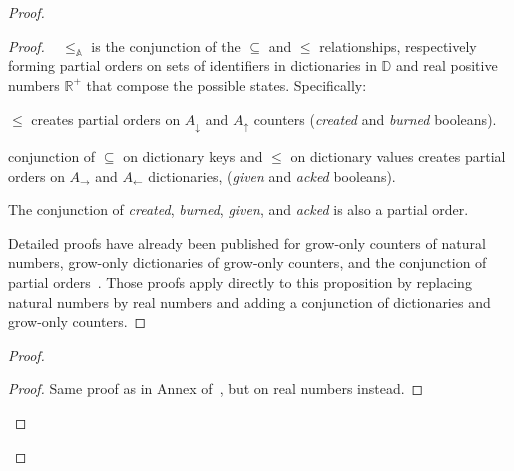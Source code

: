 \documentclass[9pt]{article}   	%
\begin{document}
	
\begin{proof}
	\begin{proof}
		\pfsketch~ $\leq_\mathds{A}$ is the conjunction of the $\subseteq$ and $\leq$ relationships, respectively forming partial orders on sets of identifiers in dictionaries in $\mathds{D}$ and real positive numbers $\mathds{R}^+$ that compose the possible states. Specifically:
		\begin{pfenum}
			\item $\leq$ creates partial orders on $A_\downarrow$ and $A_\uparrow$ counters (\textit{created} and \textit{burned} booleans).
			\item conjunction of $\subseteq$ on dictionary keys and $\leq$ on dictionary values creates partial orders on $A_\rightarrow$ and $A_\leftarrow$ dictionaries, (\textit{given} and \textit{acked} booleans).
			\item The conjunction of \textit{created}, \textit{burned}, \textit{given}, and \textit{acked} is also a partial order.
		\end{pfenum} 		
		Detailed proofs have already been published for grow-only counters of natural numbers, grow-only dictionaries of grow-only counters, and the conjunction of partial orders~\cite{lavoie2023statebased}. Those proofs apply directly to this proposition by replacing natural numbers by real numbers and adding a conjunction of dictionaries and grow-only counters.
	\end{proof}


		\begin{proof}
			\begin{proof}
				Same proof as in Annex of~\cite{lavoie2023statebased}, but on real numbers instead.
			\end{proof}
			

\end{proof}
\end{proof}
\end{document}
